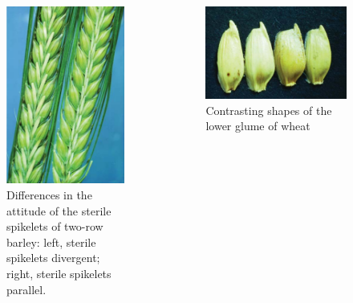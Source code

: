 \documentclass[ignorenonframetext,aspectratio=169]{beamer}
\begin{document}
\begin{frame}{}
\protect\hypertarget{section-4}{}

\begin{columns}[T,onlytextwidth]
  

\begin{figure}
\includegraphics[width=0.55\linewidth]{../images/sterile_spikelets_attitude} \caption{Differences in the attitude of the sterile spikelets of two-row barley: left, sterile spikelets divergent; right, sterile spikelets parallel.}\label{fig:spikelet-attitude}
\end{figure}


\begin{figure}
\includegraphics[width=0.75\linewidth]{../images/lower_glumes_wheat} \caption{Contrasting shapes of the lower glume of wheat}\label{fig:shape-lower-glumes}
\end{figure}

\end{columns}

\end{frame}
\end{document}

